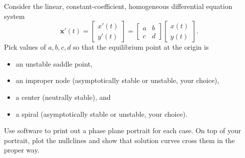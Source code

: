 \documentclass[12pt,letterpaper]{hmcpset}
\newcommand{\m}[1]{\begin{bmatrix}#1\end{bmatrix}}
\renewcommand{\bf}[1]{\mathbf{#1}}
\begin{document}
\begin{problem}[3]
    Consider the linear, constant-coefficient, homogeneous
    differential equation system
    \[
        \bf{x}'(t)=\m{x'(t)\\y'(t)}=\m{a&b\\c&d}\m{x(t)\\y(t)}.
    \]
    Pick values of $a, b, c, d$ so that the equilibrium point at the
    origin is
    \begin{itemize}
        \item an unstable saddle point,
        \item an improper node (asymptotically stable or unstable,
            your choice),
        \item a center (neutrally stable), and
        \item a spiral (asymptotically stable or unstable, your
            choice).
    \end{itemize}
    Use software to print out a phase plane portrait for each case. On
    top of your portrait, plot the nullclines and show that solution
    curves cross them in the proper way.
\end{problem}
\begin{solution}
    \vfill
\end{solution}
\newpage
\end{document}
